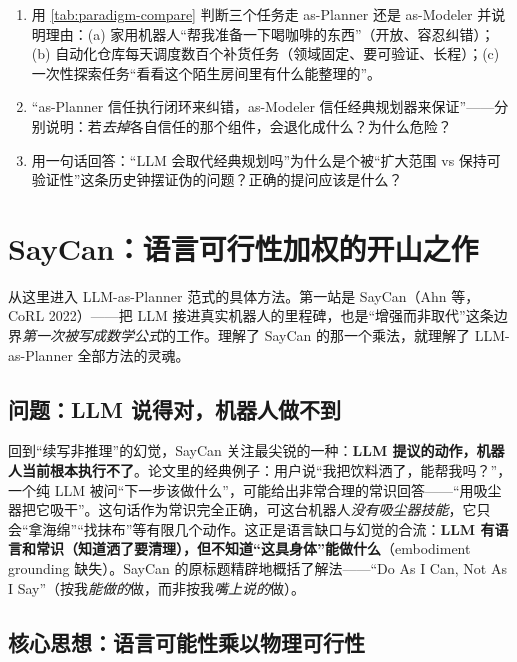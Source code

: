 \begin{exercise}
\begin{enumerate}
  \item 用 \cref{tab:paradigm-compare} 判断三个任务走 as-Planner 还是 as-Modeler 并说明理由：(a) 家用机器人“帮我准备一下喝咖啡的东西”（开放、容忍纠错）；(b) 自动化仓库每天调度数百个补货任务（领域固定、要可验证、长程）；(c) 一次性探索任务“看看这个陌生房间里有什么能整理的”。
  \item “as-Planner 信任执行闭环来纠错，as-Modeler 信任经典规划器来保证”——分别说明：若\emph{去掉}各自信任的那个组件，会退化成什么？为什么危险？
  \item 用一句话回答：“LLM 会取代经典规划吗”为什么是个被“扩大范围 vs 保持可验证性”这条历史钟摆证伪的问题？正确的提问应该是什么？
\end{enumerate}
\end{exercise}

\section{SayCan：语言可行性加权的开山之作}
\label{sec:saycan}

从这里进入 LLM-as-Planner 范式的具体方法。第一站是 SayCan（Ahn 等，CoRL 2022）——把 LLM 接进真实机器人的里程碑，也是“增强而非取代”这条边界\emph{第一次被写成数学公式}的工作。理解了 SayCan 的那一个乘法，就理解了 LLM-as-Planner 全部方法的灵魂。

\subsection{问题：LLM 说得对，机器人做不到}
\label{sec:saycan-problem}

回到“续写非推理”的幻觉，SayCan 关注最尖锐的一种：\textbf{LLM 提议的动作，机器人当前根本执行不了}。论文里的经典例子：用户说“我把饮料洒了，能帮我吗？”，一个纯 LLM 被问“下一步该做什么”，可能给出非常合理的常识回答——“用吸尘器把它吸干”。这句话作为常识完全正确，可这台机器人\emph{没有吸尘器技能}，它只会“拿海绵”“找抹布”等有限几个动作。这正是语言缺口与幻觉的合流：\textbf{LLM 有语言和常识（知道洒了要清理），但不知道“这具身体”能做什么}（embodiment grounding 缺失）。SayCan 的原标题精辟地概括了解法——“Do As I Can, Not As I Say”（按我\emph{能做的}做，而非按我\emph{嘴上说的}做）\cite{ahn2022saycan}。

\subsection{核心思想：语言可能性乘以物理可行性}
\label{sec:saycan-core}

